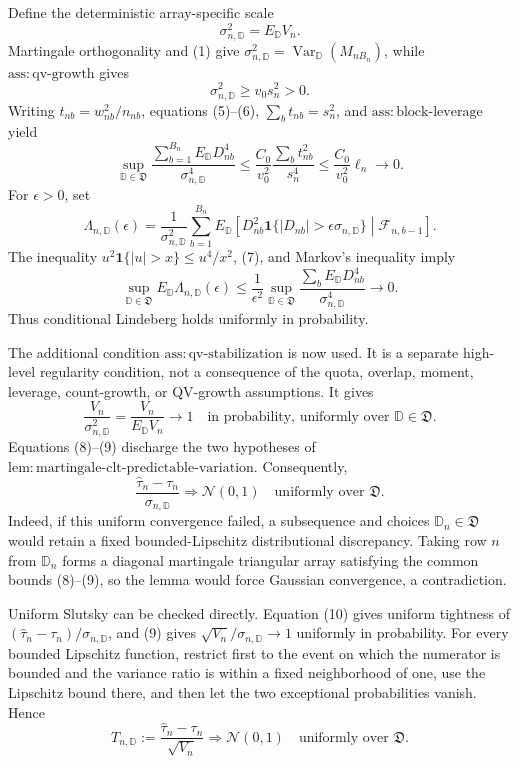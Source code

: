 Define the deterministic array-specific scale
\[
\sigma_{n,\mathbb D}^2=E_{\mathbb D}V_n.
\]
Martingale orthogonality and (1) give \(\sigma_{n,\mathbb D}^2=\operatorname{Var}_{\mathbb D}(M_{nB_n})\), while \(\mathrm{ass:qv\text{-}growth}\) gives
\[
\sigma_{n,\mathbb D}^2\ge v_0s_n^2>0.
\tag{6}
\]
Writing \(t_{nb}=w_{nb}^2/n_{nb}\), equations (5)--(6), \(\sum_bt_{nb}=s_n^2\), and \(\mathrm{ass:block\text{-}leverage}\) yield
\[
\sup_{\mathbb D\in\mathfrak D}
\frac{\sum_{b=1}^{B_n}E_{\mathbb D}D_{nb}^4}{\sigma_{n,\mathbb D}^4}
\le\frac{C_0}{v_0^2}\frac{\sum_bt_{nb}^2}{s_n^4}
\le\frac{C_0}{v_0^2}\ell_n\longrightarrow0.
\tag{7}
\]
For \(\epsilon>0\), set
\[
\Lambda_{n,\mathbb D}(\epsilon)
=\frac1{\sigma_{n,\mathbb D}^2}\sum_{b=1}^{B_n}
E_{\mathbb D}\!\left[D_{nb}^2\mathbf1\{|D_{nb}|>\epsilon\sigma_{n,\mathbb D}\}
\middle|\mathcal F_{n,b-1}\right].
\]
The inequality \(u^2\mathbf1\{|u|>x\}\le u^4/x^2\), (7), and Markov's inequality imply
\[
\sup_{\mathbb D\in\mathfrak D}E_{\mathbb D}\Lambda_{n,\mathbb D}(\epsilon)
\le\frac1{\epsilon^2}
\sup_{\mathbb D\in\mathfrak D}
\frac{\sum_bE_{\mathbb D}D_{nb}^4}{\sigma_{n,\mathbb D}^4}
\longrightarrow0.
\tag{8}
\]
Thus conditional Lindeberg holds uniformly in probability.

The additional condition \(\mathrm{ass:qv\text{-}stabilization}\) is now used. It is a separate high-level regularity condition, not a consequence of the quota, overlap, moment, leverage, count-growth, or QV-growth assumptions. It gives
\[
\frac{V_n}{\sigma_{n,\mathbb D}^2}
=\frac{V_n}{E_{\mathbb D}V_n}\longrightarrow1
\quad\text{in probability, uniformly over }\mathbb D\in\mathfrak D.
\tag{9}
\]
Equations (8)--(9) discharge the two hypotheses of \(\mathrm{lem:martingale\text{-}clt\text{-}predictable\text{-}variation}\). Consequently,
\[
\frac{\widehat\tau_n-\tau_n}{\sigma_{n,\mathbb D}}
\Rightarrow\mathcal N(0,1)
\quad\text{uniformly over }\mathfrak D.
\tag{10}
\]
Indeed, if this uniform convergence failed, a subsequence and choices \(\mathbb D_n\in\mathfrak D\) would retain a fixed bounded-Lipschitz distributional discrepancy. Taking row \(n\) from \(\mathbb D_n\) forms a diagonal martingale triangular array satisfying the common bounds (8)--(9), so the lemma would force Gaussian convergence, a contradiction.

Uniform Slutsky can be checked directly. Equation (10) gives uniform tightness of \((\widehat\tau_n-\tau_n)/\sigma_{n,\mathbb D}\), and (9) gives \(\sqrt{V_n}/\sigma_{n,\mathbb D}\to1\) uniformly in probability. For every bounded Lipschitz function, restrict first to the event on which the numerator is bounded and the variance ratio is within a fixed neighborhood of one, use the Lipschitz bound there, and then let the two exceptional probabilities vanish. Hence
\[
T_{n,\mathbb D}:=\frac{\widehat\tau_n-\tau_n}{\sqrt{V_n}}
\Rightarrow\mathcal N(0,1)
\quad\text{uniformly over }\mathfrak D.
\tag{11}
\]

